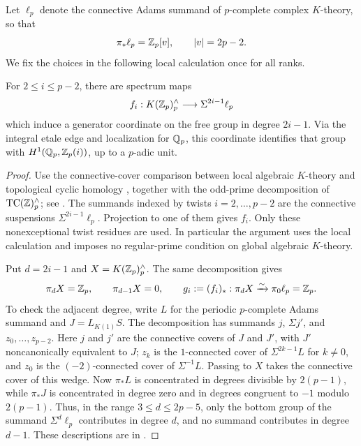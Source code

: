 Let $\ell_p$ denote the connective Adams summand of $p$-complete complex
$K$-theory, so that
\[
 \pi_*\ell_p=\mathbb Z_p[v],\qquad |v|=2p-2.
\]
We fix the choices in the following local calculation once for all
ranks.

\begin{lemma}
\label{gen:local-k-coordinates}
For $2\leq i\leq p-2$, there are spectrum maps
\[
 f_i:K(\mathbb Z_p)^\wedge_p\longrightarrow\Sigma^{2i-1}\ell_p
\]
which induce a generator coordinate on the free group in degree
$2i-1$.  Via the integral etale edge and localization for $\mathbb Q_p$, this
coordinate identifies that group with
$H^1(\mathbb Q_p,\mathbb Z_p(i))$, up to a $p$-adic unit.
\end{lemma}

\begin{proof}
Use the connective-cover comparison between local algebraic
$K$-theory and topological cyclic homology
\cite[Theorem~D and Addendum~5.2]{HesselholtMadsenWitt}, together with
the odd-prime decomposition of $\operatorname{TC}(\mathbb Z)^\wedge_p$; see
\cite[Sections~2 and~7]{BlumbergMandellTC}.  The summands indexed by twists
$i=2,\ldots,p-2$ are the connective suspensions
$\Sigma^{2i-1}\ell_p$.  Projection to one of them gives $f_i$.
Only these nonexceptional twist residues are used.  In particular the
argument uses the local calculation and imposes no regular-prime
condition on global algebraic $K$-theory.

Put $d=2i-1$ and $X=K(\mathbb Z_p)^\wedge_p$.  The same decomposition gives
\[
 \pi_dX=\mathbb Z_p,\qquad \pi_{d-1}X=0,\qquad
 g_i:=(f_i)_*:\pi_dX\xrightarrow{\sim}\pi_0\ell_p=\mathbb Z_p.
\]
To check the adjacent degree, write $L$ for the periodic $p$-complete
Adams summand and $J=L_{K(1)}S$.  The decomposition has summands
$j$, $\Sigma j'$, and $z_0,\ldots,z_{p-2}$.  Here $j$ and $j'$ are
the connective covers of $J$ and $J'$, with $J'$ noncanonically
equivalent to $J$; $z_k$ is the $1$-connected cover of
$\Sigma^{2k-1}L$ for $k\ne0$, and $z_0$ is the $(-2)$-connected
cover of $\Sigma^{-1}L$.  Passing to $X$ takes the connective cover
of this wedge.  Now $\pi_*L$ is concentrated in degrees divisible
by $2(p-1)$, while $\pi_*J$ is concentrated in degree zero and in
degrees congruent to $-1$ modulo $2(p-1)$.  Thus, in the range
$3\leq d\leq2p-5$, only the bottom group of the summand
$\Sigma^d\ell_p$ contributes in degree $d$, and no summand contributes
in degree $d-1$.  These descriptions are in
\cite[Section~2]{BlumbergMandellTC}.


\end{proof}

